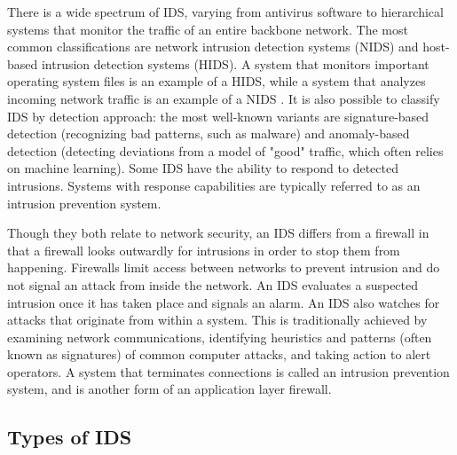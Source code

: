\documentclass[12pt]{article}
\theoremstyle{definition}
\begin{document}
		There is a wide spectrum of IDS, varying from antivirus software to hierarchical systems that monitor the traffic of an entire backbone network. The most common classifications are network intrusion detection systems (NIDS) and host-based intrusion detection systems (HIDS). A system that monitors important operating system files is an example of a HIDS, while a system that analyzes incoming network traffic is an example of a NIDS \cite{So-In2016}. It is also possible to classify IDS by detection approach: the most well-known variants are signature-based detection (recognizing bad patterns, such as malware) and anomaly-based detection (detecting deviations from a model of "good" traffic, which often relies on machine learning). Some IDS have the ability to respond to detected intrusions. Systems with response capabilities are typically referred to as an intrusion prevention system.
		
		Though they both relate to network security, an IDS differs from a firewall in that a firewall looks outwardly for intrusions in order to stop them from happening. Firewalls limit access between networks to prevent intrusion and do not signal an attack from inside the network. An IDS evaluates a suspected intrusion once it has taken place and signals an alarm. An IDS also watches for attacks that originate from within a system. This is traditionally achieved by examining network communications, identifying heuristics and patterns (often known as signatures) of common computer attacks, and taking action to alert operators. A system that terminates connections is called an intrusion prevention system, and is another form of an application layer firewall.
		\subsection{Types of IDS}
\end{document}
